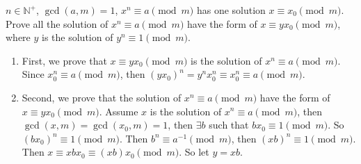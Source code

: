 \documentclass{ctexart}
\begin{document}
\begin{problem}\label{pro:5}
  \(n \in \mathbb{N}^+\), \(\gcd(a,m)=1\), \(x^n \equiv a \pmod{ m}\) has one solution \(x \equiv x_0 \pmod{ m}\).
  Prove all the solution of \(x^n \equiv a \pmod{ m}\) have the form of \(x \equiv yx_0 \pmod{ m}\),
  where \(y\) is the solution of \(y^n \equiv 1\pmod{ m}\).
\end{problem}
\begin{solution}
  \begin{enumerate}
    \item First, we prove that \(x \equiv yx_0 \pmod{m}\) is the solution of \(x^n \equiv a \pmod{m}\).
      Since \(x_0^n \equiv a \pmod{m}\), then \((yx_0)^n=y^nx_0^n \equiv x_0^n \equiv a \pmod{m}\).
    \item Second, we prove that the solution of \(x^n \equiv a \pmod{m}\) have the form of \(x \equiv yx_0 \pmod{m}\).
      Assume \(x\) is the solution of \(x^n \equiv a \pmod{m}\), then \(\gcd(x,m)=\gcd(x_0,m)=1\), then
      \(\exists b \) such that \(bx_0 \equiv 1 \pmod{m}\). So \((bx_0)^n \equiv 1 \pmod{m}\).
      Then \(b^n \equiv a^{-1} \pmod{m}\), then \((xb)^n \equiv 1 \pmod{m}\).
      Then \(x \equiv xbx_0 \equiv (xb)x_0 \pmod{m}\).
      So let \(y=xb\).
  \end{enumerate}
\end{solution}
\end{document}
